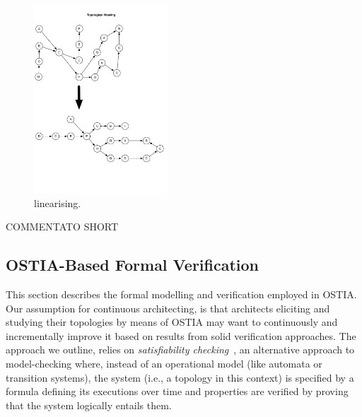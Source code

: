 \begin{figure}
	\begin{center}
		\includegraphics[width=5cm]{images/linearizing}
		\caption{linearising.}
		\label{fig:linearizing}
	\end{center}
\end{figure}


 COMMENTATO SHORT
\subsection{OSTIA-Based Formal Verification}\label{ver}


This section describes the formal modelling and verification employed in OSTIA. Our assumption for continuous architecting, is that architects eliciting and studying their topologies by means of OSTIA may want to continuously and incrementally improve it based on results from solid verification approaches. The approach we outline, relies on \textit{satisfiability checking}~\cite{MPS13}, an alternative approach to model-checking where, instead of an operational model (like automata or transition systems), the system (i.e., a topology in this context) is specified by a formula defining its executions over time and properties are verified by proving that the system logically entails them.

